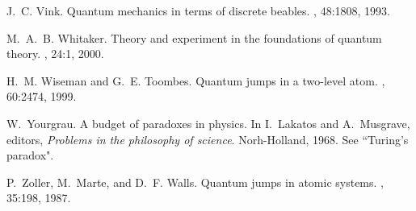 \documentclass[12pt,a4paper,reqno]{article}
\renewcommand{\(}{\left(}
\renewcommand{\)}{\right)}
\newcommand{\<}{\langle}
\renewcommand{\>}{\rangle}
\theoremstyle{plain} %
\theoremstyle{definition}
\theoremstyle{remark}
\begin{document}
\begin{thebibliography}{10}
J.~C. Vink.
\newblock Quantum mechanics in terms of discrete beables.
, 48:1808, 1993.

M.~A.~B. Whitaker.
\newblock Theory and experiment in the foundations of quantum theory.
, 24:1, 2000.

H.~M. Wiseman and G.~E. Toombes.
\newblock Quantum jumps in a two-level atom.
, 60:2474, 1999.

W.~Yourgrau.
\newblock A budget of paradoxes in physics.
\newblock In I.~Lakatos and A.~Musgrave, editors, {\em Problems in the
  philosophy of science}. Norh-Holland, 1968.
\newblock See {``Turing's paradox"}.

P.~Zoller, M.~Marte, and D.~F. Walls.
\newblock Quantum jumps in atomic systems.
, 35:198, 1987.

\end{thebibliography}
\end{document}
